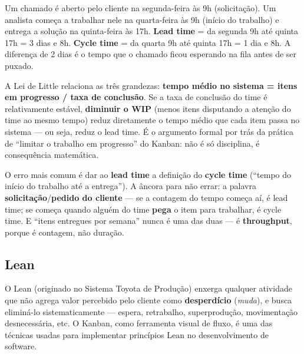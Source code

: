 \begin{exemplo}
Um chamado é aberto pelo cliente na segunda-feira às 9h (solicitação). Um
analista começa a trabalhar nele na quarta-feira às 9h (início do trabalho)
e entrega a solução na quinta-feira às 17h. \textbf{Lead time} = da
segunda 9h até quinta 17h = 3 dias e 8h. \textbf{Cycle time} = da quarta 9h
até quinta 17h = 1 dia e 8h. A diferença de 2 dias é o tempo que o chamado
ficou esperando na fila antes de ser puxado.
\end{exemplo}

\begin{conceito}
A Lei de Little relaciona as três grandezas: \textbf{tempo médio no
sistema = itens em progresso / taxa de conclusão}. Se a taxa de conclusão
do time é relativamente estável, \textbf{diminuir o WIP} (menos itens
disputando a atenção do time ao mesmo tempo) reduz diretamente o tempo
médio que cada item passa no sistema --- ou seja, reduz o lead time. É o
argumento formal por trás da prática de “limitar o trabalho em progresso” do
Kanban: não é só disciplina, é consequência matemática.
\end{conceito}

\begin{cuidado}
O erro mais comum é dar ao \textbf{lead time} a definição do
\textbf{cycle time} (“tempo do início do trabalho até a entrega”). A âncora
para não errar: a palavra \textbf{solicitação}/\textbf{pedido do cliente} ---
se a contagem do tempo começa aí, é lead time; se começa quando alguém do
time \textbf{pega} o item para trabalhar, é cycle time. E “itens entregues
por semana” nunca é uma das duas --- é \textbf{throughput}, porque é
contagem, não duração.
\end{cuidado}

\subsection{Lean}

\begin{conceito}
O Lean (originado no Sistema Toyota de Produção) enxerga qualquer atividade
que não agrega valor percebido pelo cliente como \textbf{desperdício}
(\textit{muda}), e busca eliminá-lo sistematicamente --- espera,
retrabalho, superprodução, movimentação desnecessária, etc. O Kanban, como
ferramenta visual de fluxo, é uma das técnicas usadas para implementar
princípios Lean no desenvolvimento de software.
\end{conceito}

